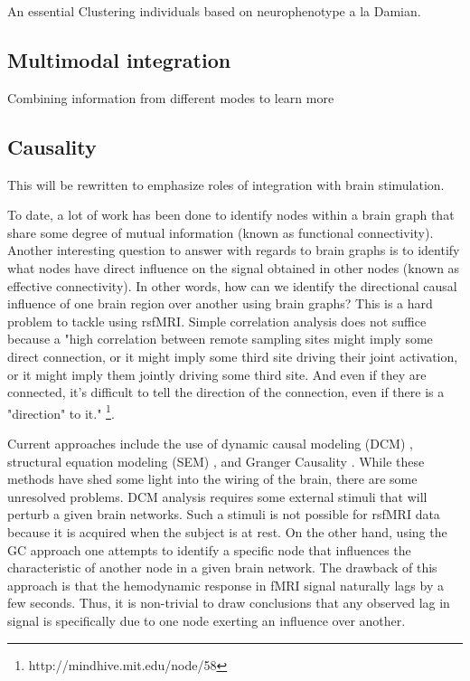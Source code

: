 An essential 
Clustering individuals based on neurophenotype a la Damian.

\subsection{Multimodal integration}

Combining information from different modes to learn more

\subsection{Causality}

This will be rewritten to emphasize roles of integration with brain stimulation.

To date, a lot of work has been done to identify nodes within a brain graph that share some degree of mutual information (known as functional connectivity). Another interesting question to answer with regards to brain graphs is to identify what nodes have direct influence on the signal obtained in other nodes (known as effective connectivity). In other words, how can we identify the directional causal influence of one brain region over another using brain graphs? This is a hard problem to tackle using rsfMRI. Simple correlation analysis does not suffice because a "high correlation between remote sampling sites might imply some direct connection, or it might imply some third site driving their joint activation, or it might imply them jointly driving some third site. And even if they are connected, it's difficult to tell the direction of the connection, even if there is a "direction" to it." \footnote{http://mindhive.mit.edu/node/58}. 

Current approaches include the use of dynamic causal modeling (DCM) \cite{}, structural equation modeling (SEM) \cite{}, and Granger Causality \cite{}. While these methods have shed some light into the wiring of the brain, there are some unresolved problems. DCM analysis requires some external stimuli that will perturb a given brain networks. Such a stimuli is not possible for rsfMRI data because it is acquired when the subject is at rest. On the other hand, using the GC approach one attempts to identify a specific node that influences the characteristic of another node in a given brain network. The drawback of this approach is that the hemodynamic response in fMRI signal naturally lags by a few seconds. Thus, it is non-trivial to draw conclusions that any observed lag in signal is specifically due to one node exerting an influence over another.   

